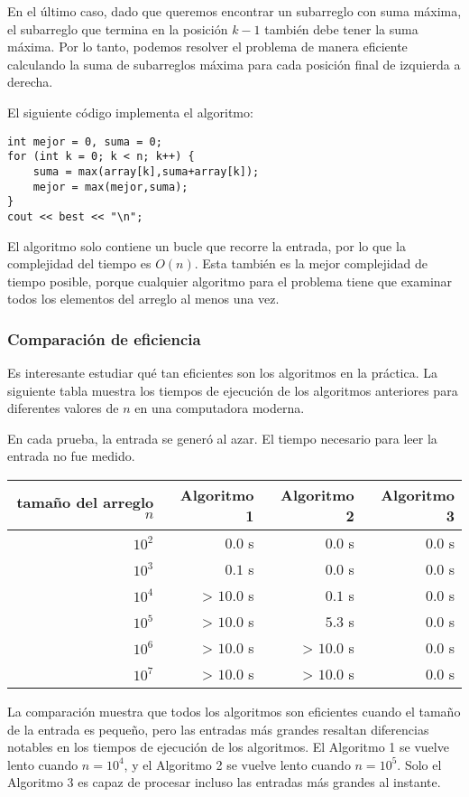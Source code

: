 En el último caso, dado que queremos
encontrar un subarreglo con suma máxima,
el subarreglo que termina en la posición $k-1$
también debe tener la suma máxima.
Por lo tanto, podemos resolver el problema de manera eficiente
calculando la suma de subarreglos máxima
para cada posición final de izquierda a derecha.

El siguiente código implementa el algoritmo:
\begin{lstlisting}
int mejor = 0, suma = 0;
for (int k = 0; k < n; k++) {
    suma = max(array[k],suma+array[k]);
    mejor = max(mejor,suma);
}
cout << best << "\n";
\end{lstlisting}

El algoritmo solo contiene un bucle
que recorre la entrada,
por lo que la complejidad del tiempo es $O(n)$.
Esta también es la mejor complejidad de tiempo posible,
porque cualquier algoritmo para el problema
tiene que examinar todos los elementos del arreglo al menos una vez.

\subsubsection{Comparación de eficiencia}

Es interesante estudiar qué tan eficientes
son los algoritmos en la práctica.
La siguiente tabla muestra los tiempos de ejecución
de los algoritmos anteriores para diferentes
valores de $n$ en una computadora moderna.

En cada prueba, la entrada se generó al azar.
El tiempo necesario para leer la entrada no fue
medido.

\begin{center}
\begin{tabular}{rrrr}
tamaño del arreglo $n$ & Algoritmo 1 & Algoritmo 2 & Algoritmo 3 \\
\hline
$10^2$ & $0.0$ s & $0.0$ s & $0.0$ s \\
$10^3$ & $0.1$ s & $0.0$ s & $0.0$ s \\
$10^4$ & > $10.0$ s & $0.1$ s & $0.0$ s \\
$10^5$ & > $10.0$ s & $5.3$ s & $0.0$ s \\
$10^6$ & > $10.0$ s & > $10.0$ s & $0.0$ s \\
$10^7$ & > $10.0$ s & > $10.0$ s & $0.0$ s \\
\end{tabular}
\end{center}

La comparación muestra que todos los algoritmos
son eficientes cuando el tamaño de la entrada es pequeño,
pero las entradas más grandes resaltan diferencias notables
en los tiempos de ejecución de los algoritmos.
El Algoritmo 1 se vuelve lento
cuando $n=10^4$, y el Algoritmo 2
se vuelve lento cuando $n=10^5$.
Solo el Algoritmo 3 es capaz de procesar
incluso las entradas más grandes al instante.
